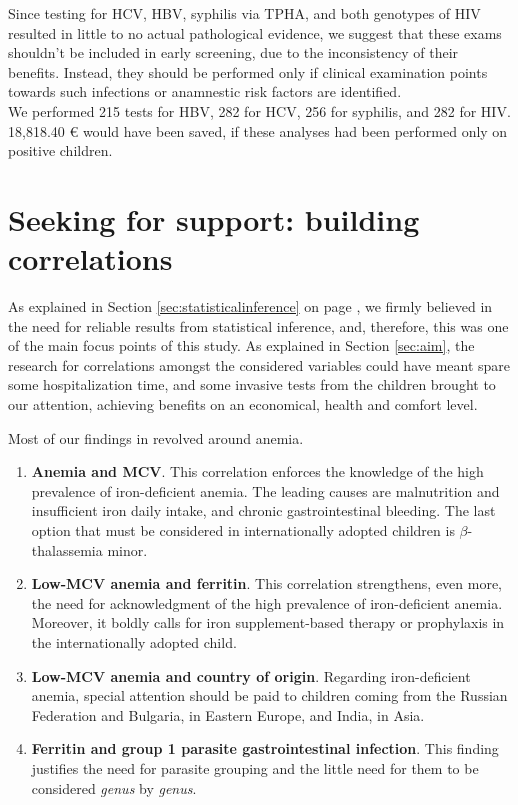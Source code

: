 Since testing for HCV, HBV, syphilis via TPHA, and both genotypes of HIV resulted in little to no actual pathological evidence, we suggest that these exams shouldn't be included in early screening, due to the inconsistency of their benefits. Instead, they should be performed only if clinical examination points towards such infections or anamnestic risk factors are identified.\\
We performed 215 tests for HBV, 282 for HCV, 256 for syphilis, and 282 for HIV. 18,818.40 € would have been saved, if these analyses had been performed only on positive children.

\section{Seeking for support: building correlations}\label{sec:seekingforsupport}
As explained in Section \ref{sec:statisticalinference} on page \pageref{sec:statisticalinference}, we firmly believed in the need for reliable results from statistical inference, and, therefore, this was one of the main focus points of this study. As explained in Section \ref{sec:aim}, the research for correlations amongst the considered variables could have meant spare some hospitalization time, and some invasive tests from the children brought to our attention, achieving benefits on an economical, health and comfort level.

Most of our findings in revolved around anemia.

\begin{enumerate}
	\item \textbf{Anemia and MCV}. This correlation enforces the knowledge of the high prevalence of iron-deficient anemia. The leading causes are malnutrition and insufficient iron daily intake, and chronic gastrointestinal bleeding. The last option that must be considered in internationally adopted children is $\beta$-thalassemia minor.
	\item \textbf{Low-MCV anemia and ferritin}. This correlation strengthens, even more, the need for acknowledgment of the high prevalence of iron-deficient anemia. Moreover, it boldly calls for iron supplement-based therapy or prophylaxis in the internationally adopted child.
	\item \textbf{Low-MCV anemia and country of origin}. Regarding iron-deficient anemia, special attention should be paid to children coming from the Russian Federation and Bulgaria, in Eastern Europe, and India, in Asia.
	\item \textbf{Ferritin and group 1 parasite gastrointestinal infection}. This finding justifies the need for parasite grouping and the little need for them to be considered \textit{genus} by \textit{genus}.
\end{enumerate}

